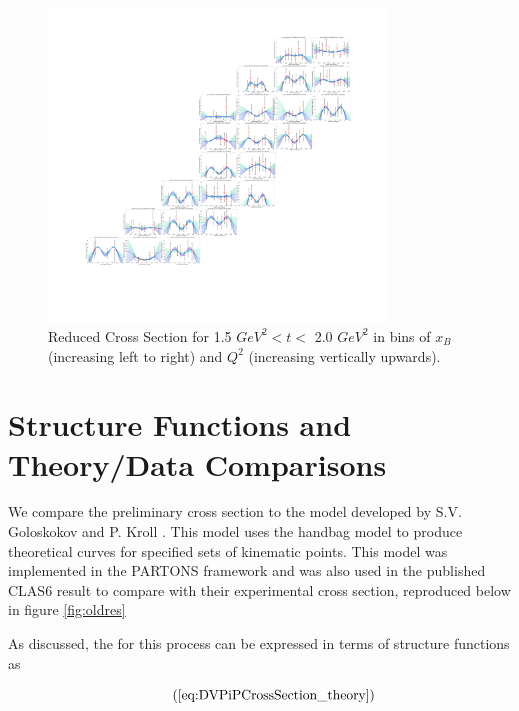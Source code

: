     \begin{figure}[ht]
        \centering
        \includegraphics[trim={14.6cm 4cm 27.2cm 4cm},clip,width=0.8\textwidth]{Chapters/Ch5-Further/c12xsec/combined_t1.5.png}
        \caption[Reduced Cross Section for 1.5 $GeV^2 < t <$ 2.0 $ GeV^2$]{Reduced Cross Section for 1.5 $ GeV^2 < t <$ 2.0 $GeV^2$ in bins of $x_B$ (increasing left to right) and $Q^2$ (increasing vertically upwards). }
        \label{fig:combined_t1.5}
    \end{figure}

\clearpage
\section{Structure Functions and Theory/Data Comparisons}
    We compare the preliminary cross section to the model developed by S.V. Goloskokov and P. Kroll \cite{Goloskokov2010AnElectroproduction}. This model uses the handbag model to produce theoretical curves for specified sets of kinematic points. This model was implemented in the PARTONS framework \cite{Berthou2018PARTONS:Software} and was also used in the published CLAS6 result to compare with their experimental cross section, reproduced below in figure \ref{fig:oldres} \cite{Bedlinskiy2014ExclusiveCLAS}
    
    As discussed, the \xsec for this process can be expressed in terms of structure functions as 
    
        \begin{equation*}
             \recallLabel{eq:DVPiPCrossSection_theory}
        \end{equation*}
    
